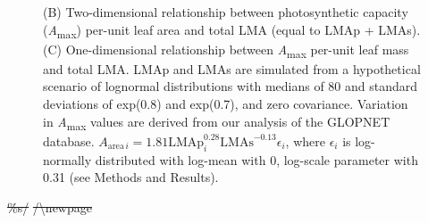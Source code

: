 \documentclass[
  12pt,
]{article}
\providecommand{\DIFdeltex}[1]{{\protect\color{red}\sout{#1}}}                      %
\providecommand{\DIFdelbegin}{} %
\providecommand{\DIFaddendFL}{} %
\providecommand{\DIFdel}[1]{\texorpdfstring{\DIFdeltex{#1}}{}} %
\newcommand{\DIFscaledelfig}{0.5}
\newlength{\DIFdelgraphicswidth} %
\newlength{\DIFdelgraphicsheight} %
\newcommand{\DIFdelincludegraphics}[2][]{%
\sbox{\DIFdelgraphicsbox}{\DIFOincludegraphics[#1]{#2}}%
\settoboxwidth{\DIFdelgraphicswidth}{\DIFdelgraphicsbox} %
\settoboxtotalheight{\DIFdelgraphicsheight}{\DIFdelgraphicsbox} %
\scalebox{\DIFscaledelfig}{%
\parbox[b]{\DIFdelgraphicswidth}{\usebox{\DIFdelgraphicsbox}\\[-\baselineskip] \rule{\DIFdelgraphicswidth}{0em}}\llap{\resizebox{\DIFdelgraphicswidth}{\DIFdelgraphicsheight}{%
\setlength{\unitlength}{\DIFdelgraphicswidth}%
\begin{picture}(1,1)%
\thicklines\linethickness{2pt} %
{\color[rgb]{1,0,0}\put(0,0){\framebox(1,1){}}}%
{\color[rgb]{1,0,0}\put(0,0){\line( 1,1){1}}}%
{\color[rgb]{1,0,0}\put(0,1){\line(1,-1){1}}}%
\end{picture}%
}\hspace*{3pt}}} %
} %
\DeclareRobustCommand{\DIFdelbegin}{\DIFOdelbegin \let\includegraphics\DIFdelincludegraphics} %
\DeclareRobustCommand{\DIFaddendFL}{\DIFOaddendFL \let\includegraphics\DIFOincludegraphics} %
\begin{document}
\begin{figure}
{{(B) Two-dimensional relationship between photosynthetic capacity (\emph{A}\textsubscript{max}) per-unit leaf area and total LMA (equal to LMAp + LMAs).
(C) One-dimensional relationship between \emph{A}\textsubscript{max} per-unit leaf mass and total LMA.
LMAp and LMAs are simulated from a hypothetical scenario of lognormal distributions with medians of 80 and standard deviations of exp(0.8) and exp(0.7), and zero covariance.
Variation in \emph{A}\textsubscript{max} values are derived from our analysis of the GLOPNET database. \(A_{\mathrm{area} \, i}=1.81\mathrm{LMAp}_i^{0.28}\mathrm{LMAs}^{-0.13}\epsilon_i\), where \(\epsilon_i\) is log-normally distributed with log-mean with 0, log-scale parameter with 0.31 (see Methods and Results).}\label{fig:Hplt}
}
\DIFaddendFL \end{figure}

\DIFdelbegin \DIFdel{\%s/}%
\DIFdel{/\textbackslash newpage
}%
\end{document}
